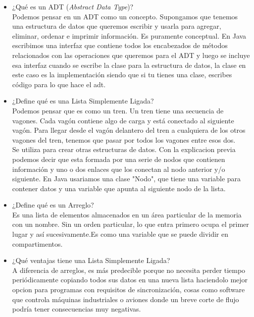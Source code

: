 \documentclass{article}
\begin{document}
\begin{itemize}
    \item ¿Qué es un ADT (\textit{Abstract Data Type})?\\
    Podemos pensar en un ADT como un concepto. Supongamos que tenemos una estructura de datos que queremos escribir y usarla para agregar, eliminar, ordenar e imprimir información. Es puramente conceptual. En Java escribimos una interfaz que contiene todos los encabezados de métodos relacionados con las operaciones que queremos para el ADT y luego se incluye esa interfaz cuando se escribe la clase para la estructura de datos, la clase en este caso es la implementación siendo que si tu tienes una clase, escribes código para lo que hace el adt.\\

    \item ¿Define qué es una Lista Simplemente Ligada?\\
    Podemos pensar que es como un tren. Un tren tiene una secuencia de vagones. Cada vagón contiene algo de carga y está conectado al siguiente vagón. Para llegar desde el vagón delantero del tren a cualquiera de los otros vagones del tren, tenemos que pasar por todos los vagones entre esos dos.\\ Se utiliza para crear otras estructuras de datos. Con la explicacion previa podemos decir que esta formada por una serie de nodos que contienen información y uno o dos enlaces que los conectan al nodo anterior y/o siguiente. En Java usariamos una clase "Nodo", que tiene una variable para contener datos y una variable que apunta al siguiente nodo de la lista.\\ 
    
    \item ¿Define qué es un Arreglo?\\
     Es una lista de elementos almacenados en un área particular de la memoria con un nombre. Sin un orden particular, lo que entra primero ocupa el primer lugar y así sucesivamente.Es como una variable que se puede dividir en compartimentos.
     
    \item ¿Qué ventajas tiene una Lista Simplemente Ligada?\\
    A diferencia de arreglos, es más predecible porque no necesita perder tiempo periódicamente copiando todos sus datos en una nueva lista haciendolo mejor opcion para programas con requisitos de sincronización, cosas como software que controla máquinas industriales o aviones donde un breve corte de flujo podría tener consecuencias muy negativas.
    \\
    

\end{itemize}
\end{document}
